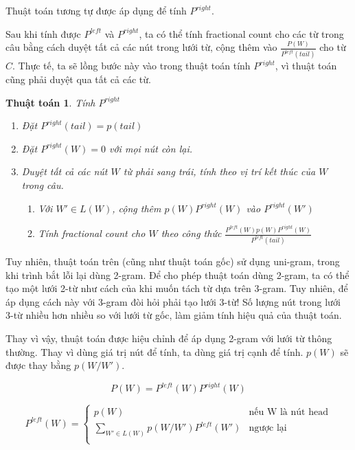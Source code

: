 \documentclass[a4paper]{book} %
\newtheorem{algo}{Thuật toán}
\begin{document}
Thuật toán tương tự được áp dụng để tính $P^{right}$.

Sau khi tính được $P^{left}$ và $P^{right}$, ta có thể tính fractional
count cho các từ trong câu bằng cách duyệt tất cả các nút trong lưới từ,
cộng thêm vào $\displaystyle\frac{P(W)}{P^{left}(tail)}$ cho từ
$C$. Thực tế, ta sẽ lồng bước này vào trong thuật toán tính
$P^{right}$, vì thuật toán cũng phải duyệt qua tất cả các từ.

\begin{algo}Tính $P^{right}$
  
\begin{enumerate}
\item Đặt $P^{right}(tail) = p(tail)$
\item Đặt $P^{right}(W) = 0$ với mọi nút còn lại.
\item Duyệt tất cả các nút $W$ từ phải sang trái, tính theo vị trí kết
  thúc của $W$ trong câu.
  \begin{enumerate}
  \item Với $W' \in L(W)$, cộng thêm $p(W)P^{right}(W)$ vào
    $P^{right}(W')$
  \item Tính fractional count cho $W$ theo công thức
    $\displaystyle\frac{P^{left}(W)p(W)P^{right}(W)}{P^{left}(tail)}$
  \end{enumerate}
\end{enumerate}
\end{algo}


Tuy nhiên, thuật toán trên (cũng như thuật toán gốc) sử dụng
uni-gram, trong khi trình bắt lỗi lại dùng 2-gram. Để cho phép thuật
toán dùng 2-gram, ta có thể tạo một lưới 2-từ như cách của
\cite{Ravishankar} khi muốn tách từ dựa trên 3-gram. Tuy nhiên, để áp
dụng cách này với 3-gram đòi hỏi phải tạo lưới 3-từ! Số lượng nút
trong lưới 3-từ nhiều hơn nhiều so với lưới từ gốc, làm giảm tính hiệu
quả của thuật toán. 

Thay vì vậy, thuật toán được hiệu chỉnh để áp dụng 2-gram với lưới từ
thông thường. Thay vì dùng giá trị nút để tính, ta dùng giá trị cạnh
để tính. $p(W)$ sẽ được thay bằng $p(W/W')$.

$$P(W)=P^{left}(W)P^{right}(W)$$

$$
P^{left}(W) = \left\{
    \begin{array}{ll}
      p(W)&\text{nếu W là nút head}\\
      \displaystyle\sum_{W' \in L(W)}p(W/W')P^{left}(W')&\text{ngược lại}\\
    \end{array}
  \right.
$$
\end{document}
